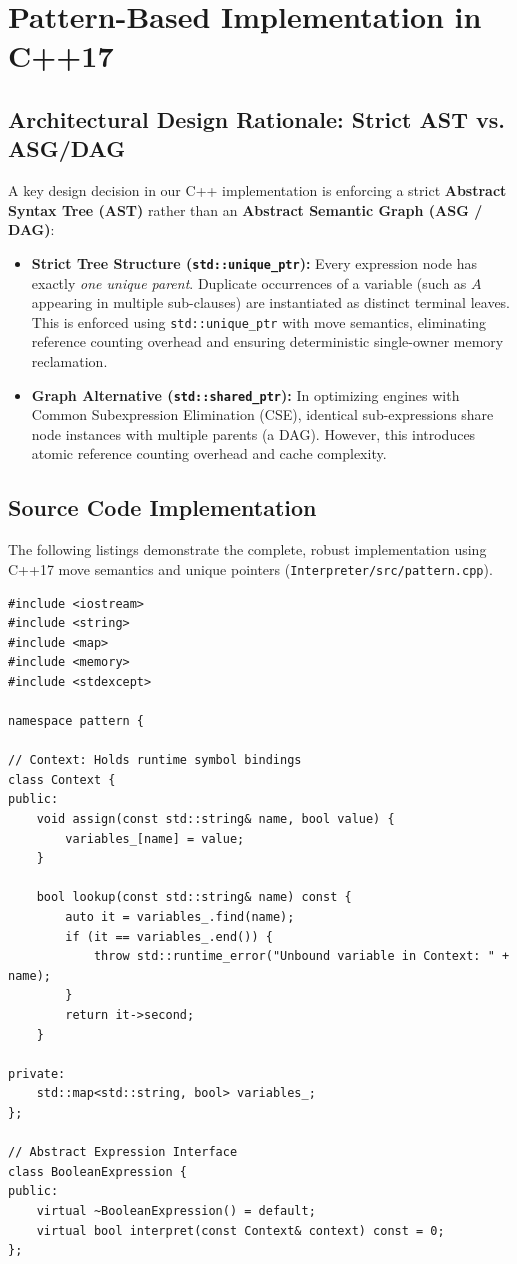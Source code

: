 \documentclass[12pt,a4paper]{article}
\begin{document}
\newpage
\section{Pattern-Based Implementation in C++17}

\subsection{Architectural Design Rationale: Strict AST vs. ASG/DAG}
A key design decision in our C++ implementation is enforcing a strict \textbf{Abstract Syntax Tree (AST)} rather than an \textbf{Abstract Semantic Graph (ASG / DAG)}:
\begin{itemize}
    \item \textbf{Strict Tree Structure (\texttt{std::unique\_ptr}):} Every expression node has exactly \textit{one unique parent}. Duplicate occurrences of a variable (such as $A$ appearing in multiple sub-clauses) are instantiated as distinct terminal leaves. This is enforced using \texttt{std::unique\_ptr} with move semantics, eliminating reference counting overhead and ensuring deterministic single-owner memory reclamation.
    \item \textbf{Graph Alternative (\texttt{std::shared\_ptr}):} In optimizing engines with Common Subexpression Elimination (CSE), identical sub-expressions share node instances with multiple parents (a DAG). However, this introduces atomic reference counting overhead and cache complexity.
\end{itemize}

\subsection{Source Code Implementation}
The following listings demonstrate the complete, robust implementation using C++17 move semantics and unique pointers (\texttt{Interpreter/src/pattern.cpp}).

\begin{lstlisting}[caption=Context and Abstract Expression Interface]
#include <iostream>
#include <string>
#include <map>
#include <memory>
#include <stdexcept>

namespace pattern {

// Context: Holds runtime symbol bindings
class Context {
public:
    void assign(const std::string& name, bool value) {
        variables_[name] = value;
    }

    bool lookup(const std::string& name) const {
        auto it = variables_.find(name);
        if (it == variables_.end()) {
            throw std::runtime_error("Unbound variable in Context: " + name);
        }
        return it->second;
    }

private:
    std::map<std::string, bool> variables_;
};

// Abstract Expression Interface
class BooleanExpression {
public:
    virtual ~BooleanExpression() = default;
    virtual bool interpret(const Context& context) const = 0;
};
\end{lstlisting}
\end{document}
